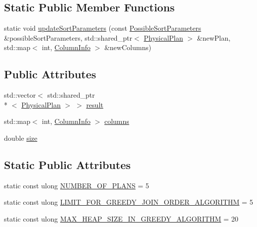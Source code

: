 \subsection*{Static Public Member Functions}
\begin{DoxyCompactItemize}
\item 
static void \hyperlink{class_algebra_compiler_a64b17061a41e21787cb35572b60d826d}{update\+Sort\+Parameters} (const \hyperlink{class_possible_sort_parameters}{Possible\+Sort\+Parameters} \&possible\+Sort\+Parameters, std\+::shared\+\_\+ptr$<$ \hyperlink{class_physical_plan}{Physical\+Plan} $>$ \&new\+Plan, std\+::map$<$ int, \hyperlink{class_column_info}{Column\+Info} $>$ \&new\+Columns)
\end{DoxyCompactItemize}
\subsection*{Public Attributes}
\begin{DoxyCompactItemize}
\item 
std\+::vector$<$ std\+::shared\+\_\+ptr\\*
$<$ \hyperlink{class_physical_plan}{Physical\+Plan} $>$ $>$ \hyperlink{class_algebra_compiler_acf3202bd193e4552a1d4fadb6d0b356c}{result}
\item 
std\+::map$<$ int, \hyperlink{class_column_info}{Column\+Info} $>$ \hyperlink{class_algebra_compiler_a33ca2507927649bb0176c00ea5944d21}{columns}
\item 
double \hyperlink{class_algebra_compiler_adcc3f8ba764b873c170cfb28d4636b16}{size}
\end{DoxyCompactItemize}
\subsection*{Static Public Attributes}
\begin{DoxyCompactItemize}
\item 
static const ulong \hyperlink{class_algebra_compiler_ab1a348c2daa3ca8f805f7cec2b35e29d}{N\+U\+M\+B\+E\+R\+\_\+\+O\+F\+\_\+\+P\+L\+A\+N\+S} = 5
\item 
static const ulong \hyperlink{class_algebra_compiler_a75bdf7e239082b0a6c8560ac5a75e72a}{L\+I\+M\+I\+T\+\_\+\+F\+O\+R\+\_\+\+G\+R\+E\+E\+D\+Y\+\_\+\+J\+O\+I\+N\+\_\+\+O\+R\+D\+E\+R\+\_\+\+A\+L\+G\+O\+R\+I\+T\+H\+M} = 5
\item 
static const ulong \hyperlink{class_algebra_compiler_aa67a35b24af1850ef0294e353f8a7184}{M\+A\+X\+\_\+\+H\+E\+A\+P\+\_\+\+S\+I\+Z\+E\+\_\+\+I\+N\+\_\+\+G\+R\+E\+E\+D\+Y\+\_\+\+A\+L\+G\+O\+R\+I\+T\+H\+M} = 20
\end{DoxyCompactItemize}


